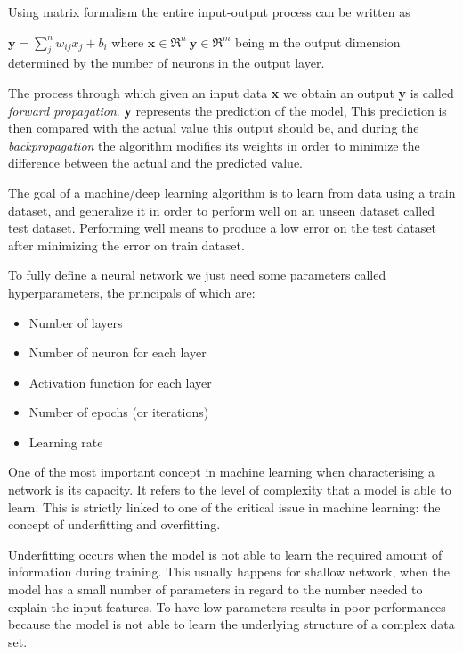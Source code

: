\documentclass[11pt]{report}
\begin{document}

Using matrix formalism the entire input-output process can be written as

$\textbf{y} = \sum_j^n w_{ij} x_j + b_i $ where $\textbf{x} \in \Re^n \ \textbf{y} \in \Re^m $ being m the output dimension determined by the number of neurons in the output layer.

The process through which given an input data \textbf{x} we obtain an output \textbf{y} is called \emph{forward propagation}.
\textbf{y} represents the prediction of the model,
This prediction is then compared with the actual value this output should be, and during the \emph{backpropagation} the algorithm modifies its weights in order to minimize the difference between the actual and the predicted value.

The goal of a machine/deep learning algorithm is to learn from data using a train dataset, and generalize it in order to perform well on an unseen dataset called test dataset.
Performing well means to produce a low error on the test dataset after minimizing the error on train dataset.


To fully define a neural network we just need some parameters called hyperparameters, the principals of which are:

\begin{itemize}
\item Number of layers
\item Number of neuron for each layer
\item Activation function for each layer
\item Number of epochs (or iterations)
\item Learning rate
\end{itemize}




One of the most important concept in machine learning when characterising a network is its capacity.
It refers to the level of complexity that a model is able to learn.
This is strictly linked to one of the critical issue in machine learning: the concept of underfitting and overfitting.

Underfitting occurs when the model is not able to learn the required amount of information during training.
This usually happens for shallow network, when the model has a small number of parameters in regard to the number needed to explain the input features.
To have low parameters results in poor performances because the model is not able to learn the underlying structure of a complex data set.
\end{document}
